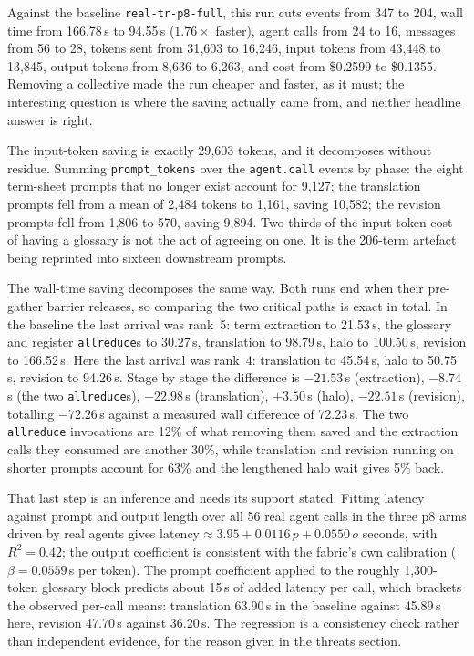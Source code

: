\documentclass[11pt]{article}
\begin{document}
Against the baseline \texttt{real-tr-p8-full}, this run cuts events from 347 to 204, wall time
from 166.78\,s to 94.55\,s ($1.76\times$ faster), agent calls from 24 to 16, messages from 56 to
28, tokens sent from 31{,}603 to 16{,}246, input tokens from 43{,}448 to 13{,}845, output tokens
from 8{,}636 to 6{,}263, and cost from \$0.2599 to \$0.1355. Removing a collective made the run
cheaper and faster, as it must; the interesting question is where the saving actually came from,
and neither headline answer is right.

The input-token saving is exactly 29{,}603 tokens, and it decomposes without residue. Summing
\texttt{prompt\_tokens} over the \texttt{agent.call} events by phase: the eight term-sheet prompts
that no longer exist account for 9{,}127; the translation prompts fell from a mean of 2{,}484
tokens to 1{,}161, saving 10{,}582; the revision prompts fell from 1{,}806 to 570, saving 9{,}894.
Two thirds of the input-token cost of having a glossary is not the act of agreeing on one. It is
the 206-term artefact being reprinted into sixteen downstream prompts.

The wall-time saving decomposes the same way. Both runs end when their pre-gather barrier
releases, so comparing the two critical paths is exact in total. In the baseline the last arrival
was rank~5: term extraction to 21.53\,s, the glossary and register \texttt{allreduce}s to
30.27\,s, translation to 98.79\,s, halo to 100.50\,s, revision to 166.52\,s. Here the last arrival
was rank~4: translation to 45.54\,s, halo to 50.75\,s, revision to 94.26\,s. Stage by stage the
difference is $-21.53$\,s (extraction), $-8.74$\,s (the two \texttt{allreduce}s), $-22.98$\,s
(translation), $+3.50$\,s (halo), $-22.51$\,s (revision), totalling $-72.26$\,s against a measured
wall difference of 72.23\,s. The two \texttt{allreduce} invocations are 12\% of what removing them
saved and the extraction calls they consumed are another 30\%, while translation and revision
running on shorter prompts account for 63\% and the lengthened halo wait gives 5\% back.

That last step is an inference and needs its support stated. Fitting latency against prompt and
output length over all 56 real agent calls in the three p8 arms driven by real agents gives
$\text{latency} \approx 3.95 + 0.0116\,p + 0.0550\,o$ seconds, with $R^2 = 0.42$; the output
coefficient is consistent with the fabric's own calibration ($\beta = 0.0559$\,s per token). The
prompt coefficient applied to the roughly 1{,}300-token glossary block predicts about 15\,s of
added latency per call, which brackets the observed per-call means: translation 63.90\,s in the
baseline against 45.89\,s here, revision 47.70\,s against 36.20\,s. The regression is a
consistency check rather than independent evidence, for the reason given in the threats section.
\end{document}
